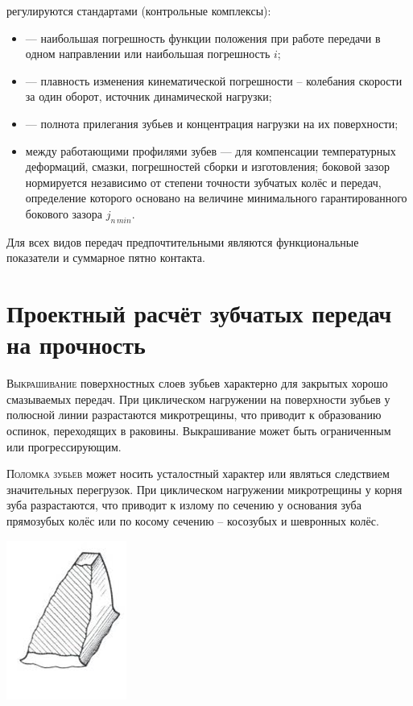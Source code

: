 \documentclass{tufte-book}
\begin{document}
 регулируются стандартами (контрольные комплексы):
\begin{itemize}
	\item {} --- наибольшая погрешность функции положения при работе передачи в одном направлении или наибольшая погрешность $ i $;
	\item {} --- плавность изменения кинематической погрешности – колебания скорости за один оборот, источник динамической нагрузки;
	\item {} --- полнота прилегания зубьев и концентрация нагрузки на их поверхности;
	\item {} между работающими профилями зубев --- для компенсации температурных деформаций, смазки, погрешностей сборки и изготовления; боковой зазор нормируется независимо от степени точности зубчатых колёс и передач, определение которого основано на величине минимального гарантированного бокового зазора $ j_{n\,min} $.
\end{itemize}

Для всех видов передач предпочтительными являются функциональные показатели  и суммарное пятно контакта.

\section{Проектный расчёт зубчатых передач на прочность}
\textsc{Выкрашивание} поверхностных слоев зубьев характерно для закрытых хорошо смазываемых передач. При циклическом нагружении на поверхности зубьев у полюсной линии разрастаются микротрещины, что приводит к образованию оспинок, переходящих в раковины. Выкрашивание может быть ограниченным или прогрессирующим.

\textsc{Поломка зубьев} может носить усталостный характер или являться следствием значительных перегрузок. При циклическом нагружении микротрещины у корня зуба разрастаются, что приводит к излому по сечению у основания зуба прямозубых колёс или по косому сечению – косозубых и шевронных колёс.
\begin{marginfigure}
	\includegraphics[width=0.4\linewidth]{polomkaZ.png}
\end{marginfigure}
\end{document}
